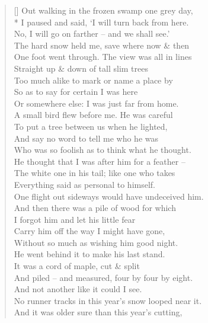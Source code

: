 \documentclass[MAIN]{subfiles}
\begin{document}
\settowidth{\versewidth}{Out walking in the frozen swamp one grey day,}
\begin{verse}[\versewidth]
Out walking in the frozen swamp one grey day,\\*
I paused and said, `I will turn back from here.\\
No, I will go on farther -- and we shall see.'\\
The hard snow held me, save where now \& then\\
One foot went through. The view was all in lines\\
Straight up \& down of tall slim trees\\
Too much alike to mark or name a place by\\
So as to say for certain I was here\\
Or somewhere else: I was just far from home.\\
A small bird flew before me. He was careful\\
To put a tree between us when he lighted,\\
And say no word to tell me who he was\\
Who was so foolish as to think what he thought.\\
He thought that I was after him for a feather --\\
The white one in his tail; like one who takes\\
Everything said as personal to himself.\\
One flight out sideways would have undeceived him.\\
And then there was a pile of wood for which\\
I forgot him and let his little fear\\
Carry him off the way I might have gone,\\
Without so much as wishing him good night.\\
He went behind it to make his last stand.\\
It was a cord of maple, cut \& split\\
And piled -- and measured, four by four by eight.\\
And not another like it could I see.\\
No runner tracks in this year's snow looped near it.\\
And it was older sure than this year's cutting,\\

\end{verse}
\end{document}
